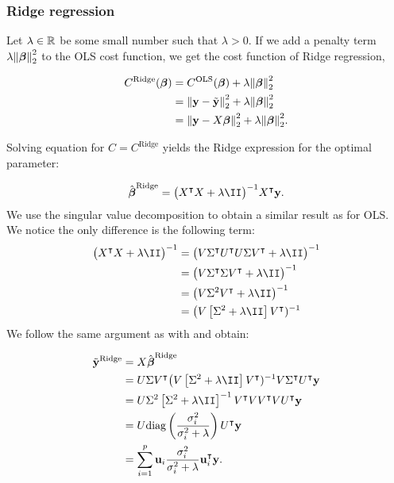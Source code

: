 \subsubsection{Ridge regression}\label{sec:Ridge}

Let $\lambda \in \mathbb{R}^{}$ be some small number such that $\lambda >0$. If we add a penalty term $\lambda \norm{\boldsymbol{\beta}}_2^2$ to the OLS cost function, we get the cost function of Ridge regression,

\begin{align*}
    C^\text{Ridge}(\boldsymbol{\beta}) &=  C^\text{OLS}(\boldsymbol{\beta}) + \lambda \norm{\boldsymbol{\beta}}_2^2 \\
    &=\norm{\mathbf{y}-\tilde{\mathbf{y}}}_2^{2}  + \lambda \norm{\boldsymbol{\beta}}_2^2 \\
    &= \norm{\mathbf{y}-X\boldsymbol{\beta}}_2^{2} + \lambda \norm{\boldsymbol{\beta}}_2^2.
\end{align*}

Solving equation  for $C=C^\mathrm{Ridge}$ yields the Ridge expression for the optimal parameter:

\begin{align*}
    \optbeta^\text{Ridge} = \big(\hessian + \lambda \II\big)^{-1} X\TT\vec{y}.
\end{align*}
We use the singular value decomposition to obtain a similar result as for OLS. We notice the only difference is the following term:
\begin{align*}
    \big(\hessian + \lambda\II\big)^{-1} &= \big(V\ST\UT U\S\VT + \lambda\II\big)^{-1}\\
    &= \big(V\ST\S\VT + \lambda\II\big)^{-1} \\
    &=\big(V\S^2\VT + \lambda\II\big)^{-1} \\
    &= \big(V\left[\S^2+\lambda\II\right]\VT)^{-1}
\end{align*}
We follow the same argument as with  and obtain:

\begin{align}\label{eq:ridge_svd}
    \tilde{\vec{y}}^{\text{Ridge}} &=X\optbeta^{\text{Ridge}} \nonumber \\
    &= U\S\VT \big(V\left[\S^2+\lambda\II\right]\VT)^{-1} V\ST\UT\vec{y}\nonumber  \\
    &= U\S^2\left[\S^2+\lambda\II\right]^{-1} \VT V\VT V\UT\vec{y}\nonumber  \\
    &= U\text{diag}\left(\frac{\sigma_i^2}{\sigma_i^2+\lambda}\right)\UT\vec{y} \nonumber \\
    &= \sum_{i=1}^p\vec{u}_i\frac{\sigma_i^2}{\sigma_i^2+\lambda}\vec{u}\TT_i\vec{y}.
\end{align}

